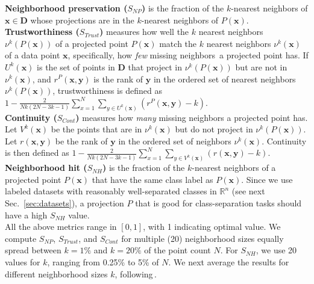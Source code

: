 \noindent\textbf{Neighborhood preservation ($S_{NP}$)} is the fraction of the $k$-nearest neighbors of $\mathbf{x} \in \mathbf{D}$ whose projections are in the $k$-nearest neighbors of $P(\mathbf{x})$.\\

\noindent\textbf{Trustworthiness ($S_{Trust}$)} measures how well the $k$ nearest neighbors $\nu^k(P(\mathbf{x}))$ of a projected point $P(\mathbf{x})$ match the $k$ nearest neighbors $\nu^k(\mathbf{x})$ of a data point $\mathbf{x}$, specifically, how \emph{few} missing neighbors\,\citep{Martins2014} a projected point has. If $U^k(\mathbf{x})$ is the set of points in $\mathbf{D}$ that project in $\nu^k(P(\mathbf{x}))$ but are not in $\nu^k(\mathbf{x})$,
and $r^P(\mathbf{x},\mathbf{y})$ is the rank of $\mathbf{y}$ in the ordered set of nearest neighbors $\nu^k(P(\mathbf{x}))$, trustworthiness is defined as \linebreak
$1-\frac{2}{N k(2 N-3 k-1)} \sum_{x=1}^{N} \sum_{y \in U^k(\mathbf{x})}(r^P(\mathbf{x}, \mathbf{y})-k)$.\\

\noindent\textbf{Continuity ($S_{Cont}$)} measures how \emph{many} missing neighbors a projected point has. Let $V^k(\mathbf{x})$
be the points that are in $\nu^k(\mathbf{x})$ but do not project in $\nu^k(P(\mathbf{x}))$. Let ${r}(\mathbf{x}, \mathbf{y})$ be the rank of $\mathbf{y}$ in the ordered set of neighbors $\nu^k(\mathbf{x})$. Continuity is then defined as \linebreak
$1-\frac{2}{N k(2 N-3 k-1)} \sum_{x=1}^{N} \sum_{y \in V^k(\mathbf{x})}({r}(\mathbf{x}, \mathbf{y})-k)$.\\

\noindent\textbf{Neighborhood hit ($S_{NH}$)} is the fraction of the $k$-nearest neighbors of a projected point $P(\mathbf{x})$ that have the same class label as $P(\mathbf{x})$. Since we use labeled datasets with reasonably well-separated classes in $\mathbb{R}^n$ (see next Sec.~\ref{sec:datasets}), a projection $P$ that is good for class-separation tasks should have a high $S_{NH}$ value.\\

All the above metrics range in $[0,1]$, with 1 indicating optimal value. 
We compute $S_{NP}$, $S_{Trust}$, and $S_{Cont}$ for multiple (20) neighborhood sizes equally spread between $k=1\%$ and $k=20\%$ of the point count $N$. For $S_{NH}$, we use 20 values for $k$, ranging from 0.25\% to 5\% of $N$. 
We next average the results for different neighborhood sizes $k$, following\,\citep{Vernier2020,Martins2015}.\\

